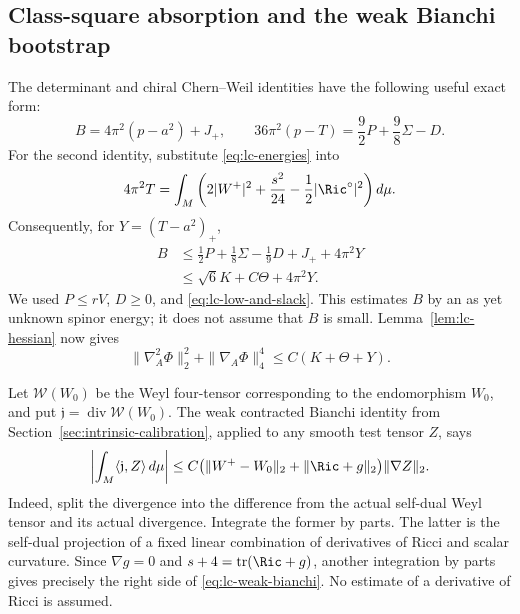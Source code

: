 \subsection{Class-square absorption and the weak Bianchi bootstrap}

The determinant and chiral Chern--Weil identities have the following
useful exact form:
\begin{equation}\label{eq:lc-chern-identities}
 B=4\pi^2(p-a^2)+J_+,
 \qquad
 36\pi^2(p-T)=\frac92P+\frac98\Sigma-D.
\end{equation}
For the second identity, substitute \eqref{eq:lc-energies} into
\[
 4\pi^2T=\int_M\left(2|W^+|^2+\frac{s^2}{24}
                              -\frac12|\Ric^\circ|^2\right)d\mu.
\]
Consequently, for $Y=(T-a^2)_+$,
\begin{equation}\label{eq:lc-absorb-B}
\begin{split}
 B&\le\frac12P+\frac18\Sigma-\frac19D+J_++4\pi^2Y\\
  &\le\sqrt6K+C\Theta+4\pi^2Y.
\end{split}
\end{equation}
We used $P\le rV$, $D\ge0$, and
\eqref{eq:lc-low-and-slack}.  This estimates $B$ by an as yet unknown
spinor energy; it does not assume that $B$ is small.  Lemma~\ref{lem:lc-hessian}
now gives
\begin{equation}\label{eq:lc-hessian-after-square}
 \|\nabla_A^2\Phi\|_2^2+\|\nabla_A\Phi\|_4^4
 \le C(K+\Theta+Y).
\end{equation}

Let $\mathcal W(W_0)$ be the Weyl four-tensor corresponding to the
endomorphism $W_0$, and put
$\mathfrak j=\operatorname{div}\mathcal W(W_0)$.  The weak contracted
Bianchi identity from Section~\ref{sec:intrinsic-calibration}, applied
to any smooth test tensor $Z$, says
\begin{equation}\label{eq:lc-weak-bianchi}
 \left|\int_M\langle\mathfrak j,Z\rangle\,d\mu\right|
 \le C\bigl(\|W^+-W_0\|_2+\|\Ric+g\|_2\bigr)\|\nabla Z\|_2.
\end{equation}
Indeed, split the divergence into the difference from the actual
self-dual Weyl tensor and its actual divergence.  Integrate the former
by parts.  The latter is the self-dual projection of a fixed linear
combination of derivatives of Ricci and scalar curvature.  Since
$\nabla g=0$ and $s+4=\operatorname{tr}(\Ric+g)$, another integration
by parts gives precisely the right side of
\eqref{eq:lc-weak-bianchi}.  No estimate of a derivative of Ricci
is assumed.

